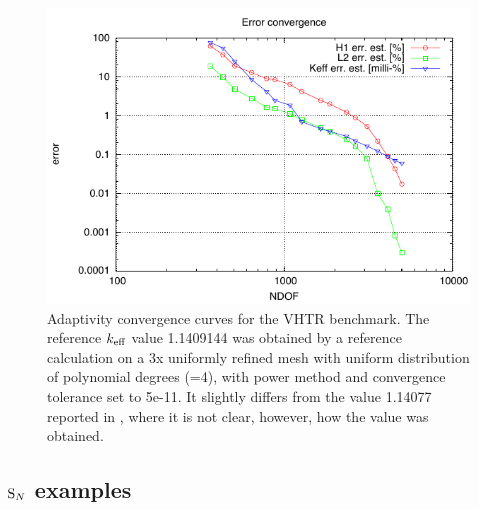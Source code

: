 \begin{figure}[!htb]
\begin{center}
  \includegraphics[scale=1]{vhtr/conv_dof}
  \caption[Adaptivity convergence curves for the VHTR benchmark]{Adaptivity convergence curves for the VHTR benchmark.
  The reference $k_{\text{eff}}$ value 1.1409144 was obtained by a reference calculation on a 3x uniformly refined mesh with uniform distribution of polynomial degrees (=4), with power method and convergence
tolerance set to 5e-11. It slightly differs from the value 1.14077 reported in \cite{Hermes-nuclear}, where it is not
clear, however, how the value was obtained.}
  \label{fig:73}
\end{center}
\end{figure}


\subsection{$\text{S}_{N}$ examples}\label{sec:snex}

